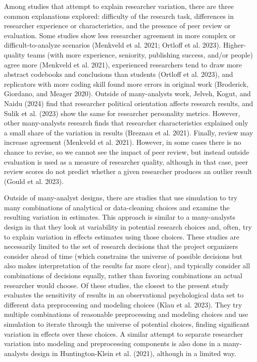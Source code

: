 \documentclass[
  letterpaper,
  DIV=11,
  numbers=noendperiod]{scrartcl}
\begin{document}
Among studies that attempt to explain researcher variation, there are
three common explanations explored: difficulty of the research task,
differences in researcher experience or characteristics, and the
presence of peer review or evaluation. Some studies show less researcher
agreement in more complex or difficult-to-analyze scenarios (Menkveld et
al. 2021; Ortloff et al. 2023). Higher-quality teams (with more
experience, seniority, publishing success, and/or people) agree more
(Menkveld et al. 2021), experienced researchers tend to draw more
abstract codebooks and conclusions than students (Ortloff et al. 2023),
and replicators with more coding skill found more errors in original
work (Broderick, Giordano, and Meager 2020). Outside of many-analysts
work, Jelveh, Kogut, and Naidu (2024) find that researcher political
orientation affects research results, and Sulik et al. (2023) show the
same for researcher personality metrics. However, other many-analysts
research finds that researcher characteristics explained only a small
share of the variation in results (Breznau et al. 2021). Finally, review
may increase agreement (Menkveld et al. 2021). However, in some cases
there is no chance to revise, so we cannot see the impact of peer
review, but instead outside evaluation is used as a measure of
researcher quality, although in that case, peer review scores do not
predict whether a given researcher produces an outlier result (Gould et
al. 2023).

Outside of many-analyst designs, there are studies that use simulation
to try many combinations of analytical or data-cleaning choices and
examine the resulting variation in estimates. This approach is similar
to a many-analysts design in that they look at variability in potential
research choices and, often, try to explain variation in effects
estimates using those choices. These studies are necessarily limited to
the set of research decisions that the project organizers consider ahead
of time (which constrains the universe of possible decisions but also
makes interpretation of the results far more clear), and typically
consider all combinations of decisions equally, rather than favoring
combinations an actual researcher would choose. Of these studies, the
closest to the present study evaluates the sensitivity of results in an
observational psychological data set to different data preprocessing and
modeling choices (Klau et al. 2023). They try multiple combinations of
reasonable preprocessing and modeling choices and use simulation to
iterate through the universe of potential choices, finding significant
variation in effects over these choices. A similar attempt to separate
researcher variation into modeling and preprocessing components is also
done in a many-analysts design in Huntington-Klein et al. (2021),
although in a limited way.
\end{document}
